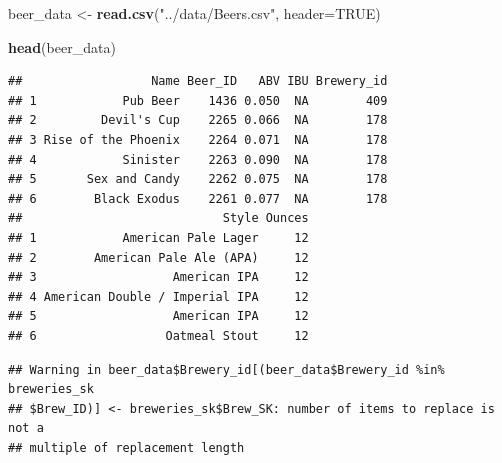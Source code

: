 \documentclass[]{article}
\newenvironment{Shaded}{\begin{snugshade}}{\end{snugshade}}
\newcommand{\KeywordTok}[1]{\textcolor[rgb]{0.13,0.29,0.53}{\textbf{#1}}}
\newcommand{\DataTypeTok}[1]{\textcolor[rgb]{0.13,0.29,0.53}{#1}}
\newcommand{\StringTok}[1]{\textcolor[rgb]{0.31,0.60,0.02}{#1}}
\newcommand{\CommentTok}[1]{\textcolor[rgb]{0.56,0.35,0.01}{\textit{#1}}}
\newcommand{\OtherTok}[1]{\textcolor[rgb]{0.56,0.35,0.01}{#1}}
\newcommand{\OperatorTok}[1]{\textcolor[rgb]{0.81,0.36,0.00}{\textbf{#1}}}
\newcommand{\NormalTok}[1]{#1}
\begin{document}
\begin{Shaded}
\begin{Highlighting}[]
\NormalTok{beer_data <-}\StringTok{ }\KeywordTok{read.csv}\NormalTok{(}\StringTok{"../data/Beers.csv"}\NormalTok{, }\DataTypeTok{header=}\OtherTok{TRUE}\NormalTok{)}


\KeywordTok{head}\NormalTok{(beer_data)}
\end{Highlighting}
\end{Shaded}

\begin{verbatim}
##                  Name Beer_ID   ABV IBU Brewery_id
## 1            Pub Beer    1436 0.050  NA        409
## 2         Devil's Cup    2265 0.066  NA        178
## 3 Rise of the Phoenix    2264 0.071  NA        178
## 4            Sinister    2263 0.090  NA        178
## 5       Sex and Candy    2262 0.075  NA        178
## 6        Black Exodus    2261 0.077  NA        178
##                            Style Ounces
## 1            American Pale Lager     12
## 2        American Pale Ale (APA)     12
## 3                   American IPA     12
## 4 American Double / Imperial IPA     12
## 5                   American IPA     12
## 6                  Oatmeal Stout     12
\end{verbatim}

\begin{Shaded}
\end{Shaded}

\begin{verbatim}
## Warning in beer_data$Brewery_id[(beer_data$Brewery_id %in% breweries_sk
## $Brew_ID)] <- breweries_sk$Brew_SK: number of items to replace is not a
## multiple of replacement length
\end{verbatim}

\begin{Shaded}
\end{Shaded}
\end{document}
